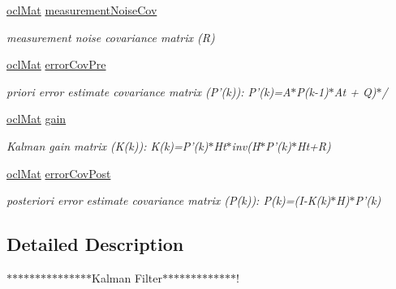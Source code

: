 \begin{DoxyCompactItemize}
\hyperlink{classcv_1_1ocl_1_1oclMat}{ocl\-Mat} \hyperlink{classcv_1_1ocl_1_1KalmanFilter_a492394c2d843a14f3e070808593a9c55}{measurement\-Noise\-Cov}
\begin{DoxyCompactList}\small\item\em measurement noise covariance matrix (R) \end{DoxyCompactList}\item 
\hyperlink{classcv_1_1ocl_1_1oclMat}{ocl\-Mat} \hyperlink{classcv_1_1ocl_1_1KalmanFilter_a5079ae8f4c64f5a27ad65455d8b526c7}{error\-Cov\-Pre}
\begin{DoxyCompactList}\small\item\em priori error estimate covariance matrix (P'(k))\-: P'(k)=A$\ast$\-P(k-\/1)$\ast$\-At + Q)$\ast$/ \end{DoxyCompactList}\item 
\hyperlink{classcv_1_1ocl_1_1oclMat}{ocl\-Mat} \hyperlink{classcv_1_1ocl_1_1KalmanFilter_a426dbaf80ff0c39347badfc47c2320a3}{gain}
\begin{DoxyCompactList}\small\item\em Kalman gain matrix (K(k))\-: K(k)=P'(k)$\ast$\-Ht$\ast$inv(H$\ast$\-P'(k)$\ast$\-Ht+\-R) \end{DoxyCompactList}\item 
\hyperlink{classcv_1_1ocl_1_1oclMat}{ocl\-Mat} \hyperlink{classcv_1_1ocl_1_1KalmanFilter_af6415a482e0905ee321a13c65865ec0b}{error\-Cov\-Post}
\begin{DoxyCompactList}\small\item\em posteriori error estimate covariance matrix (P(k))\-: P(k)=(I-\/\-K(k)$\ast$\-H)$\ast$\-P'(k) \end{DoxyCompactList}\end{DoxyCompactItemize}


\subsection{Detailed Description}
$\ast$$\ast$$\ast$$\ast$$\ast$$\ast$$\ast$$\ast$$\ast$$\ast$$\ast$$\ast$$\ast$$\ast$$\ast$\-Kalman Filter$\ast$$\ast$$\ast$$\ast$$\ast$$\ast$$\ast$$\ast$$\ast$$\ast$$\ast$$\ast$$\ast$! 

